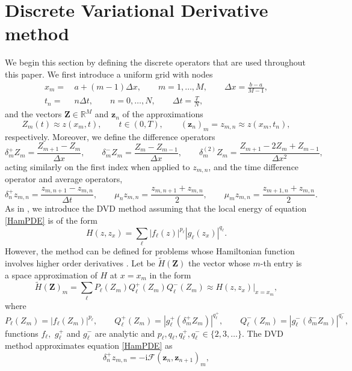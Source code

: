 \documentclass[twoside]{article}
\numberwithin{equation}{section}
\begin{document}
\section{Discrete Variational Derivative method}\label{DVDsec}
We begin this section by defining the discrete operators that are used throughout this paper. We first introduce a uniform grid with nodes
\begin{align*}
x_m=&\,a+(m-1)\Delta x,\qquad m=1,\ldots,M,\qquad \Delta x=\frac{b-a}{M-1},\\
t_n=&\,n\Delta t,\qquad n=0,\ldots,N,\qquad \Delta t=\frac{T}{N},
\end{align*}
and the vectors $\mathbf{Z}\in\mathbb{R}^M$ and $\mathbf{z}_n$ of the approximations
$$Z_m(t)\approx z(x_m,t),\qquad t\in(0,T),\qquad (\mathbf{z}_n)_m=z_{m,n}\approx z(x_m,t_n),$$
respectively. Moreover, we define the difference operators
$$\delta_m^+Z_m=\frac{Z_{m+1}-Z_m}{\Delta x},\qquad \delta_m^-Z_m=\frac{Z_{m}-Z_{m-1}}{\Delta x},	\qquad \delta_m^{(2)}Z_m=\frac{Z_{m+1}-2Z_m+Z_{m-1}}{\Delta x^2},$$
acting similarly on the first index when applied to $z_{m,n}$, and the time difference operator and average operators,
$$\delta_n^+z_{m,n}=\frac{z_{m,n+1}-z_{m,n}}{\Delta t},\qquad \mu_nz_{m,n}=\frac{z_{m,n+1}+z_{m,n}}{2},\qquad \mu_mz_{m,n}=\frac{z_{m+1,n}+z_{m,n}}{2}.$$
As in \cite{Matsuo}, we introduce the DVD method assuming that the local energy of equation \eqref{HamPDE} is of the form
$$H(z,z_x)=\sum_\ell |f_\ell(z)|^{p_\ell} |g_\ell(z_x)|^{q_\ell}.$$
However, the method can be defined for problems whose Hamiltonian function involves higher order derivatives \cite{Matsuo}. 
Let be $\widetilde H(\mathbf{Z})$ the vector whose $m$-th entry is a space approximation of $H$ at $x=x_m$ in the form
\begin{equation}\label{locHam}
\widetilde H(\mathbf{Z})_m=\sum_\ell P_\ell(Z_m)Q^+_\ell(Z_m)Q^-_\ell(Z_m)\approx H(z,z_x)\vert_{x=x_m},
\end{equation}
where
\begin{equation}\label{PQ}
P_\ell(Z_m)=|f_\ell(Z_m)|^{p_\ell},\qquad Q_\ell^+(Z_m)=|g_\ell^+(\delta_m^+Z_m)|^{q^+_\ell},\qquad Q_\ell^-(Z_m)=|g_\ell^-(\delta_m^-Z_m)|^{q^-_\ell},
\end{equation}
functions $f_\ell,$ $g_\ell^+$ and $g_\ell^-$ are analytic and  $p_\ell,q_\ell,q_\ell^+,q_\ell^-\in\{2,3,\ldots\}$.
The DVD method approximates equation \eqref{HamPDE} as
\begin{equation}\label{DVDgen}
\delta_n^+z_{m,n}=-\mathrm{i}\mathcal{F}(\mathbf{z}_n,\mathbf{z}_{n+1})_m,
\end{equation}
\end{document}
